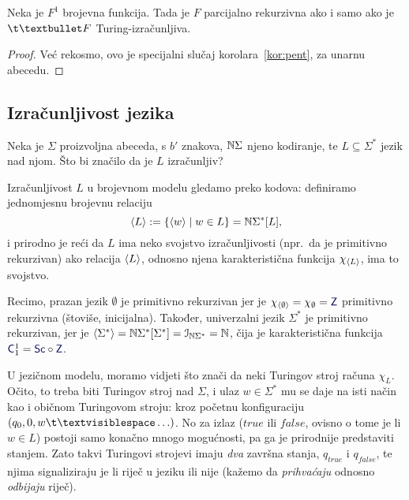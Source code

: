 \begin{korolar}\label{kor:peuf}
Neka je $F^1$\! brojevna funkcija. Tada je $F$ parcijalno rekurzivna ako i samo ako je $\t\textbullet F$ Turing-izračunljiva.
\end{korolar}
\begin{proof}
Već rekosmo, ovo je specijalni slučaj korolara~\ref{kor:pent}, za unarnu abecedu.
\end{proof}

\subsection{Izračunljivost jezika}\label{sec:Todl}

Neka je $\Sigma$ proizvoljna abeceda, s $b'$ znakova, ${\mathbb N}\Sigma$ njeno kodiranje, te $L\subseteq\Sigma^*$ jezik nad njom. Što bi značilo da je $L$ izračunljiv?

Izračunljivost $L$ u brojevnom modelu gledamo preko kodova: definiramo jednomjesnu brojevnu relaciju
\begin{equation}\label{eq:kodLdef}
    \langle L\rangle:=\{\langle w\rangle\mid w\in L\}={\mathbb N}\Sigma^*[L]\text,
\end{equation}
i prirodno je reći da $L$ ima neko svojstvo izračunljivosti (npr.\ da je primitivno rekurzivan) ako relacija $\langle L\rangle$, odnosno njena karakteristična funkcija $\chi_{\langle L\rangle}$, ima to svojstvo.

Recimo, prazan jezik $\emptyset$ je primitivno rekurzivan jer je $\chi_{\kr\emptyset}=\chi_\emptyset=\f Z$ primitivno rekurzivna (štoviše, inicijalna). Također, univerzalni jezik $\Sigma^*$ je primitivno rekurzivan, jer je $\langle\Sigma^*\rangle={\mathbb N}\Sigma^*[\Sigma^*]=\mathcal I_{{\mathbb N}\Sigma^*}={\mathbb N}$, čija je karakteristična funkcija $\f C_1^1=\f{Sc}\circ\f Z$.

U jezičnom modelu, moramo vidjeti što znači da neki Turingov stroj računa $\chi_L$. Očito, to treba biti Turingov stroj nad $\Sigma$, i ulaz $w\in\Sigma^*$ mu se daje na isti način kao i običnom Turingovom stroju: kroz početnu konfiguraciju $(q_0,0,w\bl\ldots)$. No za izlaz ($\mathit{true}$ ili $\mathit{false}$, ovisno o tome je li $w\in L$) postoji samo konačno mnogo mogućnosti, pa ga je prirodnije predstaviti stanjem. Zato takvi Turingovi strojevi imaju \emph{dva} završna stanja, $q_{\mathit{true}}$ i $q_{\mathit{false}}$, te njima signaliziraju je li riječ u jeziku ili nije (kažemo da \emph{prihvaćaju} odnosno \emph{odbijaju} riječ).

